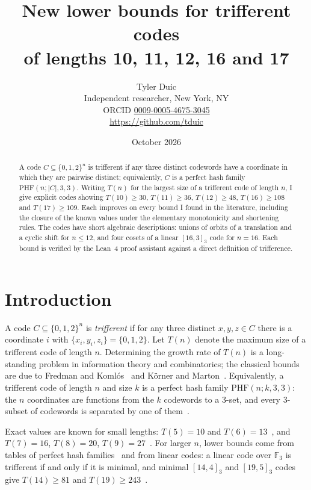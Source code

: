 \documentclass[11pt]{article}
\title{New lower bounds for trifferent codes\\ of lengths 10, 11, 12, 16 and 17}
\author{Tyler Duic\\[2pt]\small Independent researcher, New York, NY\\\small ORCID \href{https://orcid.org/0009-0005-4675-3045}{0009-0005-4675-3045}\\\small\url{https://github.com/tduic}}
\date{October 2026}
\theoremstyle{remark}
\newcommand{\F}{\mathbb{F}}
\begin{document}
\maketitle

\begin{abstract}
A code $C\subseteq\{0,1,2\}^n$ is trifferent if any three distinct codewords have a coordinate in which they are pairwise distinct; equivalently, $C$ is a perfect hash family $\mathrm{PHF}(n;|C|,3,3)$.
Writing $T(n)$ for the largest size of a trifferent code of length $n$, I give explicit codes showing
$T(10)\ge 30$, $T(11)\ge 36$, $T(12)\ge 48$, $T(16)\ge 108$ and $T(17)\ge 109$.
Each improves on every bound I found in the literature, including the closure of the known values under the elementary monotonicity and shortening rules.
The codes have short algebraic descriptions: unions of orbits of a translation and a cyclic shift for $n\le 12$, and four cosets of a linear $[16,3]_3$ code for $n=16$.
Each bound is verified by the Lean~4 proof assistant against a direct definition of trifference.
\end{abstract}

\section{Introduction}

A code $C\subseteq\{0,1,2\}^n$ is \emph{trifferent} if for any three distinct $x,y,z\in C$ there is a coordinate $i$ with $\{x_i,y_i,z_i\}=\{0,1,2\}$.
Let $T(n)$ denote the maximum size of a trifferent code of length $n$.
Determining the growth rate of $T(n)$ is a long-standing problem in information theory and combinatorics; the classical bounds are due to Fredman and Koml\'os~\cite{fredman1984} and K\"orner and Marton~\cite{korner1988}.
Equivalently, a trifferent code of length $n$ and size $k$ is a perfect hash family $\mathrm{PHF}(n;k,3,3)$: the $n$ coordinates are functions from the $k$ codewords to a $3$-set, and every $3$-subset of codewords is separated by one of them~\cite{walker2007}.

Exact values are known for small lengths: $T(5)=10$ and $T(6)=13$~\cite{dellafiore2022}, and $T(7)=16$, $T(8)=20$, $T(9)=27$~\cite{kurz2024}.
For larger $n$, lower bounds come from tables of perfect hash families~\cite{walker2007} and from linear codes: a linear code over $\F_3$ is trifferent if and only if it is minimal, and minimal $[14,4]_3$ and $[19,5]_3$ codes give $T(14)\ge 81$ and $T(19)\ge 243$~\cite{bishnoi2023,kurz2024}.
\end{document}
